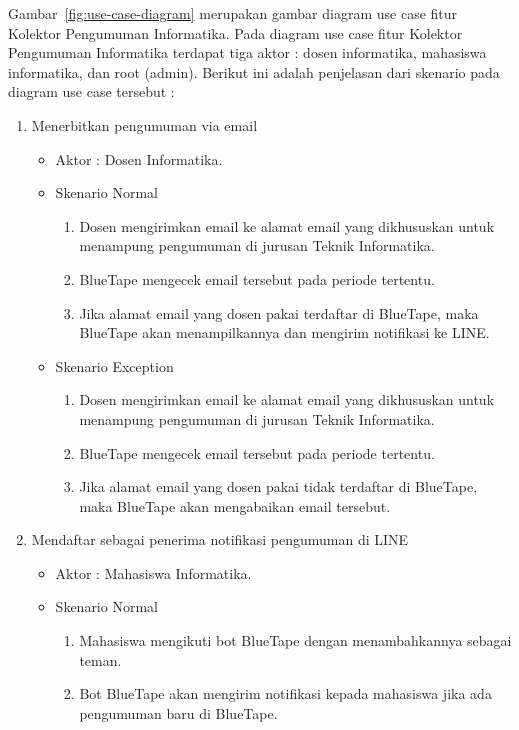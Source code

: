 Gambar~\ref{fig:use-case-diagram} merupakan gambar diagram use case fitur Kolektor Pengumuman Informatika. Pada diagram use case fitur Kolektor Pengumuman Informatika terdapat tiga aktor : dosen informatika, mahasiswa informatika, dan root (admin). Berikut ini adalah penjelasan dari skenario pada diagram use case tersebut :
\begin{enumerate}
\item Menerbitkan pengumuman via email

\begin{itemize}
	\item Aktor : Dosen Informatika.
	\item Skenario Normal

	\begin{enumerate}
		\item Dosen mengirimkan email ke alamat email yang dikhususkan untuk menampung pengumuman di jurusan Teknik Informatika.
		\item BlueTape mengecek email tersebut pada periode tertentu.
		\item Jika alamat email yang dosen pakai terdaftar di BlueTape, maka BlueTape akan menampilkannya dan mengirim notifikasi ke LINE.
	\end{enumerate}
	
	\item Skenario Exception
	\begin{enumerate}
		\item Dosen mengirimkan email ke alamat email yang dikhususkan untuk menampung pengumuman di jurusan Teknik Informatika.
		\item BlueTape mengecek email tersebut pada periode tertentu.
		\item Jika alamat email yang dosen pakai tidak terdaftar di BlueTape, maka BlueTape akan mengabaikan email tersebut.
	\end{enumerate}
\end{itemize}

\item Mendaftar sebagai penerima notifikasi pengumuman di LINE

\begin{itemize}
	\item Aktor : Mahasiswa Informatika.
	\item Skenario Normal

	\begin{enumerate}
		\item Mahasiswa mengikuti bot BlueTape dengan menambahkannya sebagai teman.
		\item Bot BlueTape akan mengirim notifikasi kepada mahasiswa jika ada pengumuman baru di BlueTape.
	\end{enumerate}
\end{itemize}


\end{enumerate}
